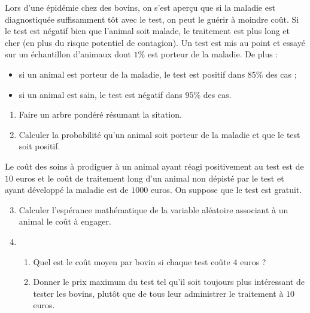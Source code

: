\documentclass[11pt]{article}
\begin{document}
\begin{exo}[$4$ points]
  Lors d'une épidémie chez des bovins, on s'est aperçu que si la maladie est
  diagnostiquée suffisamment tôt avec le test, on peut le guérir à moindre coût.
  Si le test est négatif bien que l'animal soit malade, le traitement est plus
  long et cher (en plus du risque potentiel de contagion). Un test est mis au
  point et essayé sur un échantillon d'animaux dont $1$\% est porteur de la
  maladie. De plus :
  \begin{itemize}
    \item si un animal est porteur de la maladie, le test est positif dans
      $85$\% des cas ;
    \item si un animal est sain, le test est négatif dans $95$\% des cas.
  \end{itemize}
  \begin{enumerate}
    \item Faire un arbre pondéré résumant la sitation.
    \item Calculer la probabilité qu'un animal soit porteur de la maladie et que
      le test soit positif.
  \end{enumerate}
  Le coût des soins à prodiguer à un animal ayant réagi positivement au test est
  de $10$ euros et le coût de traitement long d'un animal non dépisté par le
  test et ayant développé la maladie est de $1000$ euros. On suppose que le test
  est gratuit.
  \begin{enumerate}
      \setcounter{enumi}{2}
    \item Calculer l'espérance mathématique de la variable aléatoire associant
      à un animal le coût à engager.
    \item \begin{enumerate}
        \item Quel est le coût moyen par bovin si chaque test coûte $4$ euros ?
        \item Donner le prix maximum du test tel qu'il soit toujours plus
          intéressant de tester les bovins, plutôt que de tous leur administrer
          le traitement à $10$ euros.
      \end{enumerate}
  \end{enumerate}
\end{exo}
\end{document}
